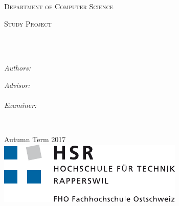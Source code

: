\begin{titlepage}
\begin{center}

\vspace*{.06\textheight}
{\scshape\LARGE \univname\par} %

{\scshape\large Department of Computer Science\par}\vspace{1.2cm} %
\textsc{\Large Study Project}\\[0.5cm] %

\HRule \\[0.4cm] %
{\huge \bfseries \ttitle\par}\vspace{0.4cm} %
\HRule \\[1.5cm] %
 
\begin{minipage}[t]{0.4\textwidth}
\begin{flushleft} \large
\emph{Authors:}\\
\authorname %
\end{flushleft}
\end{minipage}
\begin{minipage}[t]{0.4\textwidth}
\begin{flushright} \large
\emph{Advisor:} \\
\supname \\[1cm]
\emph{Examiner:} \\
\examname
\end{flushright}
\end{minipage}\\[3cm]
 
\vfill

{\large Autumn Term 2017}\\[4cm] %
\includegraphics{resources/logo_hsr} %
 
\vfill
\end{center}
\end{titlepage}

